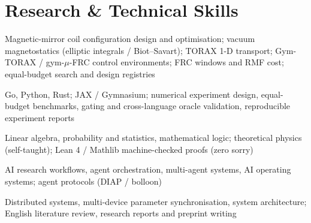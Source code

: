 \documentclass[10pt,a4paper]{article}
\begin{document}
\section{Research \& Technical Skills}

\begin{description}[leftmargin=3.4cm, labelsep=0.3cm, topsep=2pt, itemsep=0pt]
\item[Fusion \& Simulation] Magnetic-mirror coil configuration design and optimisation; vacuum magnetostatics (elliptic integrals / Biot--Savart); TORAX 1-D transport; Gym-TORAX / gym-$\mu$-FRC control environments; FRC windows and RMF cost; equal-budget search and design registries
\item[Numerical \& Languages] Go, Python, Rust; JAX / Gymnasium; numerical experiment design, equal-budget benchmarks, gating and cross-language oracle validation, reproducible experiment reports
\item[Math \& Formalisation] Linear algebra, probability and statistics, mathematical logic; theoretical physics (self-taught); Lean 4 / Mathlib machine-checked proofs (zero sorry)
\item[AI Research Systems] AI research workflows, agent orchestration, multi-agent systems, AI operating systems; agent protocols (DIAP / bolloon)
\item[Systems \& Collaboration] Distributed systems, multi-device parameter synchronisation, system architecture; English literature review, research reports and preprint writing
\end{description}
\end{document}
